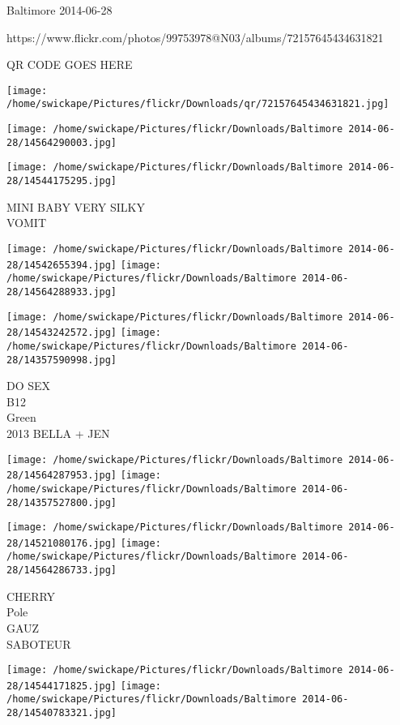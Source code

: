 \documentclass[10pt,letterpaper]{article}
\begin{document}
Baltimore 2014-06-28

https://www.flickr.com/photos/99753978@N03/albums/72157645434631821

QR CODE GOES HERE

\texttt{[image: /home/swickape/Pictures/flickr/Downloads/qr/72157645434631821.jpg]}
\pagebreak

\texttt{[image: /home/swickape/Pictures/flickr/Downloads/Baltimore 2014-06-28/14564290003.jpg]}

\vspace{0.25in}
\texttt{[image: /home/swickape/Pictures/flickr/Downloads/Baltimore 2014-06-28/14544175295.jpg]}

MINI BABY VERY SILKY\\
VOMIT\\
\pagebreak

\texttt{[image: /home/swickape/Pictures/flickr/Downloads/Baltimore 2014-06-28/14542655394.jpg]}
\texttt{[image: /home/swickape/Pictures/flickr/Downloads/Baltimore 2014-06-28/14564288933.jpg]}

\texttt{[image: /home/swickape/Pictures/flickr/Downloads/Baltimore 2014-06-28/14543242572.jpg]}
\texttt{[image: /home/swickape/Pictures/flickr/Downloads/Baltimore 2014-06-28/14357590998.jpg]}

DO SEX\\
B12\\
Green\\
2013 BELLA + JEN\\
\pagebreak

\texttt{[image: /home/swickape/Pictures/flickr/Downloads/Baltimore 2014-06-28/14564287953.jpg]}
\texttt{[image: /home/swickape/Pictures/flickr/Downloads/Baltimore 2014-06-28/14357527800.jpg]}

\texttt{[image: /home/swickape/Pictures/flickr/Downloads/Baltimore 2014-06-28/14521080176.jpg]}
\texttt{[image: /home/swickape/Pictures/flickr/Downloads/Baltimore 2014-06-28/14564286733.jpg]}

CHERRY\\
Pole\\
GAUZ\\
SABOTEUR\\
\pagebreak

\texttt{[image: /home/swickape/Pictures/flickr/Downloads/Baltimore 2014-06-28/14544171825.jpg]}
\texttt{[image: /home/swickape/Pictures/flickr/Downloads/Baltimore 2014-06-28/14540783321.jpg]}
\end{document}
